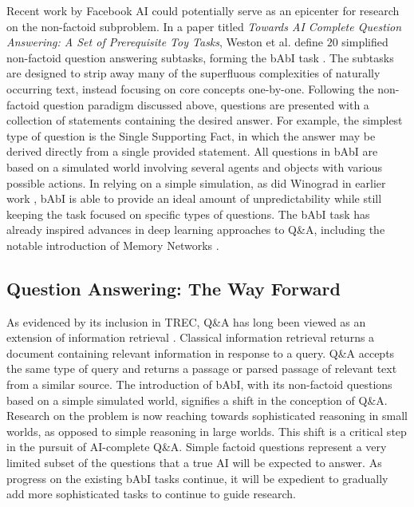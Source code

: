 Recent work by Facebook AI could potentially serve as an epicenter for research on the non-factoid subproblem. In a paper titled \textit{Towards AI Complete Question Answering: A Set of Prerequisite Toy Tasks}, Weston et al. define $20$ simplified non-factoid question answering subtasks, forming the bAbI task  \citep{weston2015towards}. The subtasks are designed to strip away many of the superfluous complexities of naturally occurring text, instead focusing on core concepts one-by-one. Following the non-factoid question paradigm discussed above, questions are presented with a collection of statements containing the desired answer. For example, the simplest type of question is the Single Supporting Fact, in which the answer may be derived directly from a single provided statement. All questions in bAbI are based on a simulated world involving several agents and objects with various possible actions. In relying on a simple simulation, as did Winograd in earlier work  \citep{winograd1971procedures}, bAbI is able to provide an ideal amount of unpredictability while still keeping the task focused on specific types of questions. The bAbI task has already inspired advances in deep learning approaches to Q\&A, including the notable introduction of Memory Networks  \citep{sukhbaatar2015weakly}.

\subsection{Question Answering: The Way Forward}

As evidenced by its inclusion in TREC, Q\&A has long been viewed as an extension of information retrieval  \citep{kolomiyets2011survey}. Classical information retrieval returns a document containing relevant information in response to a query. Q\&A accepts the same type of query and returns a passage or parsed passage of relevant text from a similar source. The introduction of bAbI, with its non-factoid questions based on a simple simulated world, signifies a shift in the conception of Q\&A. Research on the problem is now reaching towards sophisticated reasoning in small worlds, as opposed to simple reasoning in large worlds. This shift is a critical step in the pursuit of AI-complete Q\&A. Simple factoid questions represent a very limited subset of the questions that a true AI will be expected to answer. As progress on the existing bAbI tasks continue, it will be expedient to gradually add more sophisticated tasks to continue to guide research.

